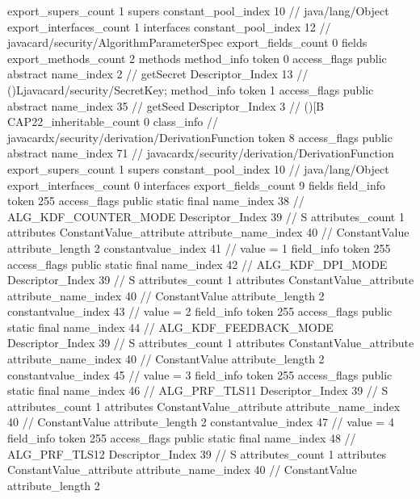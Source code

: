 {{{			export_supers_count	1
			supers {
				constant_pool_index	10		// java/lang/Object
			}
			export_interfaces_count	1
			interfaces {
				constant_pool_index	12		// javacard/security/AlgorithmParameterSpec
			}
			export_fields_count	0
			fields {
			}
			export_methods_count	2
			methods {
				method_info {
					token	0
					access_flags	public abstract
					name_index	2		// getSecret
					Descriptor_Index	13		// ()Ljavacard/security/SecretKey;
				}
				method_info {
					token	1
					access_flags	public abstract
					name_index	35		// getSeed
					Descriptor_Index	3		// ()[B
				}
			}
			CAP22_inheritable_count	0
		}
		class_info {		// javacardx/security/derivation/DerivationFunction
			token	8
			access_flags	public abstract
			name_index	71		// javacardx/security/derivation/DerivationFunction
			export_supers_count	1
			supers {
				constant_pool_index	10		// java/lang/Object
			}
			export_interfaces_count	0
			interfaces {
			}
			export_fields_count	9
			fields {
			field_info {
				token	255
				access_flags	public static final
				name_index	38		// ALG_KDF_COUNTER_MODE
				Descriptor_Index	39		// S
				attributes_count	1
				attributes {
				ConstantValue_attribute {
					attribute_name_index	40		// ConstantValue
					attribute_length	2
					constantvalue_index	41		// value = 1
				}
				}
			}
			field_info {
				token	255
				access_flags	public static final
				name_index	42		// ALG_KDF_DPI_MODE
				Descriptor_Index	39		// S
				attributes_count	1
				attributes {
				ConstantValue_attribute {
					attribute_name_index	40		// ConstantValue
					attribute_length	2
					constantvalue_index	43		// value = 2
				}
				}
			}
			field_info {
				token	255
				access_flags	public static final
				name_index	44		// ALG_KDF_FEEDBACK_MODE
				Descriptor_Index	39		// S
				attributes_count	1
				attributes {
				ConstantValue_attribute {
					attribute_name_index	40		// ConstantValue
					attribute_length	2
					constantvalue_index	45		// value = 3
				}
				}
			}
			field_info {
				token	255
				access_flags	public static final
				name_index	46		// ALG_PRF_TLS11
				Descriptor_Index	39		// S
				attributes_count	1
				attributes {
				ConstantValue_attribute {
					attribute_name_index	40		// ConstantValue
					attribute_length	2
					constantvalue_index	47		// value = 4
				}
				}
			}
			field_info {
				token	255
				access_flags	public static final
				name_index	48		// ALG_PRF_TLS12
				Descriptor_Index	39		// S
				attributes_count	1
				attributes {
				ConstantValue_attribute {
					attribute_name_index	40		// ConstantValue
					attribute_length	2
}}}}}}}
